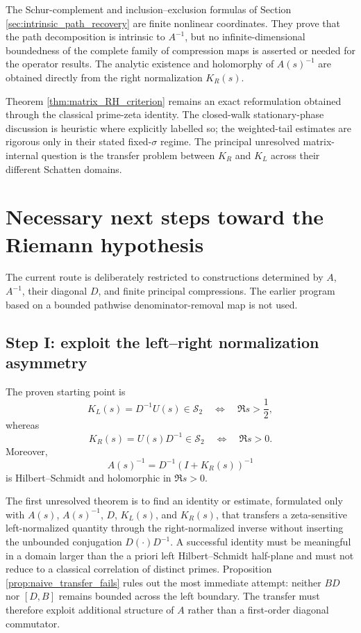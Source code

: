 \documentclass[11pt]{amsart}
\numberwithin{equation}{section}
\theoremstyle{plain}
\theoremstyle{definition}
\theoremstyle{remark}
\newcommand{\HS}{\mathcal S_2}
\begin{document}
The Schur-complement and inclusion--exclusion formulas of Section \ref{sec:intrinsic_path_recovery} are finite nonlinear coordinates.  They prove that the path decomposition is intrinsic to $A^{-1}$, but no infinite-dimensional boundedness of the complete family of compression maps is asserted or needed for the operator results.  The analytic existence and holomorphy of $A(s)^{-1}$ are obtained directly from the right normalization $K_R(s)$.

Theorem \ref{thm:matrix_RH_criterion} remains an exact reformulation obtained through the classical prime-zeta identity.  The closed-walk stationary-phase discussion is heuristic where explicitly labelled so; the weighted-tail estimates are rigorous only in their stated fixed-$\sigma$ regime.  The principal unresolved matrix-internal question is the transfer problem between $K_R$ and $K_L$ across their different Schatten domains.

\section{Necessary next steps toward the Riemann hypothesis}
\label{sec:next_steps}

The current route is deliberately restricted to constructions determined by $A$, $A^{-1}$, their diagonal $D$, and finite principal compressions.  The earlier program based on a bounded pathwise denominator-removal map is not used.

\subsection{Step I: exploit the left--right normalization asymmetry}
\label{subsec:step1}

The proven starting point is
\begin{equation}
K_L(s)=D^{-1}U(s)\in\HS\quad\Longleftrightarrow\quad \Re s>\frac12,
\label{eq:step1_left}
\end{equation}
whereas
\begin{equation}
K_R(s)=U(s)D^{-1}\in\HS\quad\Longleftrightarrow\quad \Re s>0.
\label{eq:step1_right}
\end{equation}
Moreover,
\begin{equation}
A(s)^{-1}=D^{-1}(I+K_R(s))^{-1}
\label{eq:step1_inverse}
\end{equation}
is Hilbert--Schmidt and holomorphic in $\Re s>0$.

The first unresolved theorem is to find an identity or estimate, formulated only with $A(s)$, $A(s)^{-1}$, $D$, $K_L(s)$, and $K_R(s)$, that transfers a zeta-sensitive left-normalized quantity through the right-normalized inverse without inserting the unbounded conjugation $D(\cdot)D^{-1}$.  A successful identity must be meaningful in a domain larger than the a priori left Hilbert--Schmidt half-plane and must not reduce to a classical correlation of distinct primes.  Proposition \ref{prop:naive_transfer_fails} rules out the most immediate attempt: neither $BD$ nor $[D,B]$ remains bounded across the left boundary.  The transfer must therefore exploit additional structure of $A$ rather than a first-order diagonal commutator.
\end{document}

